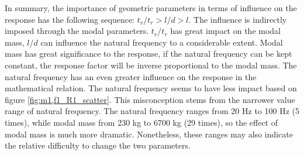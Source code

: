 In summary, the importance of geometric parameters in terms of influence on the response has the following sequence: $t_v/t_r>l/d>l$. The influence is indirectly imposed through the modal parameters. $t_v/t_r$ has great impact on the modal mass, $l/d$ can influence the natural frequency to a considerable extent. Modal mass has great significance to the response, if the natural frequency can be kept constant, the response factor will be inverse proportional to the modal mass. The natural frequency has an even greater influence on the response in the mathematical relation. The natural frequency seems to have less impact based on figure \ref{fig:m1,f1_R1_scatter}. This misconception stems from the narrower value range of natural frequency. The natural frequency ranges from 20 Hz to 100 Hz (5 times), while modal mass from 230 kg to 6700 kg (29 times), so the effect of modal mass is much more dramatic. Nonetheless, these ranges may also indicate the relative difficulty to change the two parameters.  